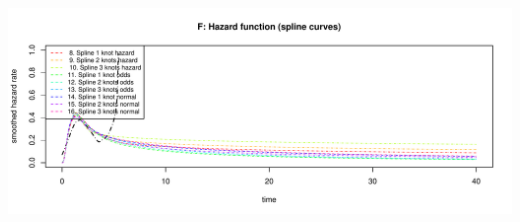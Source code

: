 \documentclass[
]{article}
\begin{document}
\begin{flushleft}\includegraphics[height=0.29\textheight]{Images/validate_extrapolation3-6} \end{flushleft}

\begin{table}


\end{table}
\end{document}
